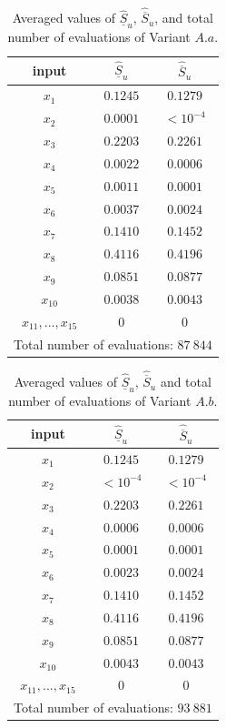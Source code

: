 {\begin{table}[!ht]
\caption{Averaged values of $\widehat{\underline{S}}_u$, ${\widehat{\overline{S}}_u}$, and total number of evaluations of Variant $A.a$.}
\centering
\begin{tabular}{ccc}
\hline
 input & $\widehat{\underline{S}}_u$ & $\widehat{\overline{S}}_u$ \\ \hline
 $x_1$ & $0.1245$ & $0.1279$  \\ \hline
 $x_2$ & $0.0001$ & $< 10^{-4}$  \\ \hline
 $x_3$ & $0.2203$ & $0.2261$  \\ \hline
 $x_4$ & $0.0022$ & $0.0006$  \\ \hline
 $x_5$ & $0.0011$ & $0.0001$  \\ \hline
 $x_6$ & $0.0037$ & $0.0024$  \\ \hline 
 $x_7$ & $0.1410$ & $0.1452$  \\ \hline
 $x_8$ & $0.4116$ & $0.4196$  \\ \hline
 $x_9$ & $0.0851$ & $0.0877$  \\ \hline
 $x_{10}$ & $0.0038$ & $0.0043$  \\ \hline
 $x_{11},\dots,x_{15}$ & $0$ & $0$  \\ \hline
\hline
\multicolumn{3}{l}{Total number of evaluations: $87 \ 844$} \\ \hline 
\end{tabular}
\label{res.wing.Aa}
\end{table}
\begin{table}[!ht]
\caption{Averaged values of $\widehat{\underline{S}}_u$, ${\widehat{\overline{S}}_u}$ and total number of evaluations of Variant $A.b$.}
 \centering
\begin{tabular}{ccc}
\hline
  input & $\widehat{\underline{S}}_u$ & $\widehat{\overline{S}}_u$ \\ \hline
 $x_1$ & $0.1245$ & $0.1279$  \\ \hline
 $x_2$ & $< 10^{-4}$ & $< 10^{-4}$  \\ \hline
 $x_3$ & $0.2203$ & $0.2261$  \\ \hline
 $x_4$ & $0.0006$ & $0.0006$  \\ \hline
 $x_5$ & $0.0001$ & $0.0001$  \\ \hline
 $x_6$ & $0.0023$ & $0.0024$  \\ \hline 
 $x_7$ & $0.1410$ & $0.1452$  \\ \hline
 $x_8$ & $0.4116$ & $0.4196$  \\ \hline
 $x_9$ & $0.0851$ & $0.0877$  \\ \hline
 $x_{10}$ & $0.0043$ & $0.0043$  \\ \hline
 $x_{11},\dots,x_{15}$ & $0$ & $0$  \\ \hline
\hline
\multicolumn{3}{l}{Total number of evaluations: $93 \ 881$} \\ \hline 
\end{tabular}
\label{res.wing.Ab}
\end{table}

}
